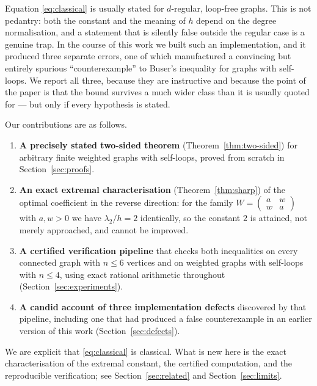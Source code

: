 \documentclass[11pt,a4paper]{article}
\theoremstyle{plain}
\theoremstyle{definition}
\begin{document}
Equation \eqref{eq:classical} is usually stated for $d$-regular, loop-free
graphs.  This is not pedantry: both the constant and the meaning of $h$ depend
on the degree normalisation, and a statement that is silently false outside the
regular case is a genuine trap.  In the course of this work we built such an
implementation, and it produced three separate errors, one of which manufactured
a convincing but entirely spurious ``counterexample'' to Buser's inequality for
graphs with self-loops.  We report all three, because they are instructive and
because the point of the paper is that the bound survives a much wider class
than it is usually quoted for --- but only if every hypothesis is stated.

Our contributions are as follows.

\begin{enumerate}[leftmargin=*,itemsep=2pt]
\item \textbf{A precisely stated two-sided theorem} (Theorem~\ref{thm:two-sided})
for arbitrary finite weighted graphs with self-loops, proved from scratch in
Section~\ref{sec:proofs}.

\item \textbf{An exact extremal characterisation} (Theorem~\ref{thm:sharp})
of the optimal coefficient in the reverse direction: for the family
$W=\begin{pmatrix}a&w\\ w&a\end{pmatrix}$ with $a,w>0$ we have
$\lambda_2/h=2$ identically, so the constant $2$ is attained, not merely
approached, and cannot be improved.

\item \textbf{A certified verification pipeline} that checks both inequalities
on every connected graph with $n\le 6$ vertices and on weighted graphs with
self-loops with $n\le 4$, using exact rational arithmetic throughout
(Section~\ref{sec:experiments}).

\item \textbf{A candid account of three implementation defects} discovered by
that pipeline, including one that had produced a false counterexample in an
earlier version of this work (Section~\ref{sec:defects}).
\end{enumerate}

We are explicit that \eqref{eq:classical} is classical.  What is new here is
the exact characterisation of the extremal constant, the certified computation,
and the reproducible verification; see Section~\ref{sec:related} and
Section~\ref{sec:limits}.
\end{document}
